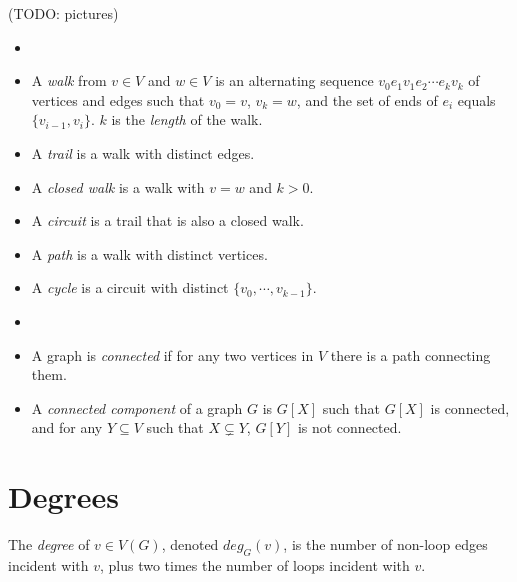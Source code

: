         (TODO: pictures)
        
        \begin{defn} \label{def_graph_path} \begin{itemize}
            \item[]
            \item A \emph{walk} from $v \in V$ and $w \in V$ is an alternating sequence $v_0 e_1 v_1 e_2 \cdots e_k v_k$ of vertices and edges such that $v_0 = v$, $v_k = w$, and the set of ends of $e_i$ equals $\{v_{i-1}, v_i\}$. $k$ is the \emph{length} of the walk.
            \item A \emph{trail} is a walk with distinct edges.
            \item A \emph{closed walk} is a walk with $v=w$ and $k>0$.
            \item A \emph{circuit} is a trail that is also a closed walk.
            \item A \emph{path} is a walk with distinct vertices.
            \item A \emph{cycle} is a circuit with distinct $\{v_0, \cdots, v_{k-1}\}$.
        \end{itemize} \end{defn}
        
        \begin{defn}[Connectivity] \label{def_connected_graph} \begin{itemize}
            \item []
            \item A graph is \emph{connected} if for any two vertices in $V$ there is a path connecting them.
            \item A \emph{connected component} of a graph $G$ is $G[X]$ such that $G[X]$ is connected, and for any $Y \subseteq V$ such that $X \subsetneq Y$, $G[Y]$ is not connected.
        \end{itemize} \end{defn}
    
    \section{Degrees}
    
        \begin{defn}[Degree] \label{def_graph_degree}
            The \emph{degree} of $v \in V(G)$, denoted $deg_G(v)$, is the number of non-loop edges incident with $v$, plus two times the number of loops incident with $v$.
        \end{defn}
        
